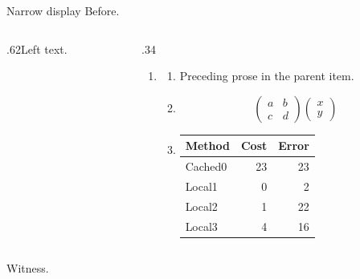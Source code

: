 \documentclass[12pt,aspectratio=169]{beamer}
\begin{document}
\begin{frame}[t,shrink=5]{Narrow display}
Before.\par
\begin{columns}[onlytextwidth,T]
\begin{column}{.62\textwidth}Left text.\end{column}
\begin{column}{.34\textwidth}
\begin{enumerate}\item \begin{enumerate}
\item Preceding prose in the parent item.
\item \[\begin{pmatrix}a&b\\c&d\end{pmatrix}\begin{pmatrix}x\\y\end{pmatrix}\]
\item \begin{tabular}{lrr}Method&Cost&Error\\\hline Cached0&23&23\\Local1&0&2\\Local2&1&22\\Local3&4&16\\\end{tabular}
\end{enumerate}\end{enumerate}
\end{column}\end{columns}
Witness.\par
\end{frame}
\end{document}
